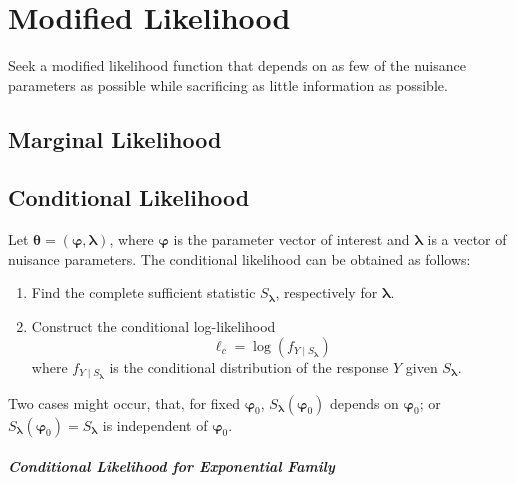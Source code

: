\chapter{Modified Likelihood}

Seek a modified likelihood function that depends on as few of the nuisance parameters as possible while sacrificing as little information as possible.

\section{Marginal Likelihood}

\section{Conditional Likelihood}

Let $\boldsymbol{\theta}=(\boldsymbol{\varphi},\boldsymbol{\lambda})$, where $\boldsymbol{\varphi}$ is the parameter vector of interest and $\boldsymbol{\lambda}$ is a vector of nuisance parameters. The conditional likelihood can be obtained as follows:
\begin{enumerate}
    \item Find the complete sufficient statistic $S_{\boldsymbol{\lambda}}$, respectively for $\boldsymbol{\lambda}$.
    \item  Construct the conditional log-likelihood
          \begin{equation}
              \ell_{c}=\log\left(f_{Y\mid S_{\boldsymbol{\lambda}}}\right)
          \end{equation}
          where $f_{Y\mid S_{\boldsymbol{\lambda}}}$ is the conditional distribution of the response $Y$ given $S_{\boldsymbol{\lambda}}$.
\end{enumerate}

\begin{note}
    Two cases might occur, that, for fixed $\boldsymbol{\varphi}_{0}$, $S_{\boldsymbol{\lambda}}\left(\boldsymbol{\varphi}_{0}\right)$ depends on $\boldsymbol{\varphi}_{0}$; or $S_{\boldsymbol{\lambda}}\left(\boldsymbol{\varphi}_{0}\right)=S_{\boldsymbol{\lambda}}$ is independent of $\boldsymbol{\varphi}_{0}$.
\end{note}

\begin{example}

\end{example}

\paragraph*{Conditional Likelihood for Exponential Family}

